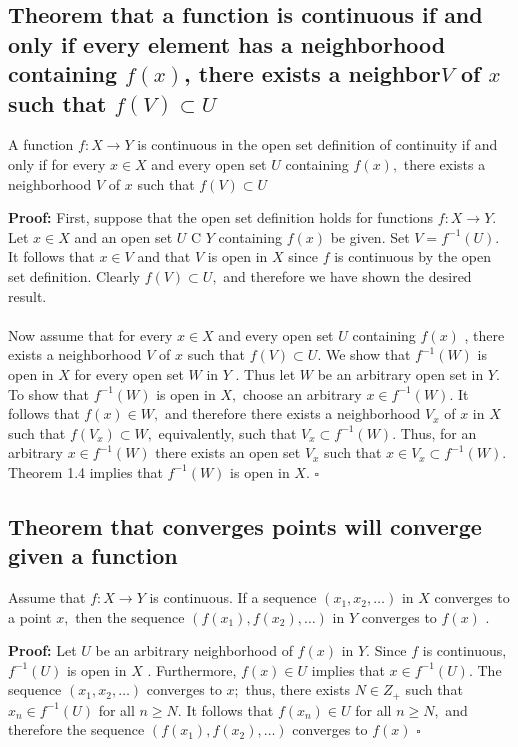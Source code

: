 \documentclass[12pt]{article}
\newenvironment{proofed}[1][]{\par \medskip \noindent \textbf{#1 Proof: }}{\hfill$\square$}
\begin{document}
	\subsection{Theorem that a function is continuous if and only if every element has a neighborhood containing $ f(x) $, there exists a neighbor$ V $ of $ x $ such that $ f(V)\subset U $}
		A function $f : X \rightarrow Y$ is continuous in the open set definition of continuity if and only if for every $x \in X$ and every open set $U$ containing $f ( x ) ,$ there exists a neighborhood $V$ of $x$ such that $f ( V ) \subset U$
		\begin{proofed}
			First, suppose that the open set definition holds for functions
			$f : X \rightarrow Y .$ Let $x \in X$ and an open set $U$ C $Y$ containing $f ( x )$ be
			given. Set $V = f ^ { - 1 } ( U ) .$ It follows that $x \in V$ and that $V$ is open in $X$
			since $f$ is continuous by the open set definition. Clearly $f ( V ) \subset U ,$ and
			therefore we have shown the desired result.\\
			\\
			Now assume that for every $x \in X$ and every open set $U$ containing
			$f ( x )$ , there exists a neighborhood $V$ of $x$ such that $f ( V ) \subset U .$ We show
			that $f ^ { - 1 } ( W )$ is open in $X$ for every open set $W$ in $Y$ . Thus let $W$ be an arbitrary open set in $Y .$ To show that $f ^ { - 1 } ( W )$ is open in $X ,$ choose an
			arbitrary $x \in f ^ { - 1 } ( W ) .$ It follows that $f ( x ) \in W ,$ and therefore there
			exists a neighborhood $V _ { x }$ of $x$ in $X$ such that $f \left( V _ { x } \right) \subset W ,$ equivalently,
			such that $V _ { x } \subset f ^ { - 1 } ( W ) .$ Thus, for an arbitrary $x \in f ^ { - 1 } ( W )$ there exists an open set $V _ { x }$ such that $x \in V _ { x } \subset f ^ { - 1 } ( W ) .$ Theorem 1.4 implies that
			$f ^ { - 1 } ( W )$ is open in $X .$
		\end{proofed}
	\subsection{Theorem that converges points will converge given a function}
		 Assume that $f : X \rightarrow Y$ is continuous. If a sequence
		$\left( x _ { 1 } , x _ { 2 } , \ldots \right)$ in $X$ converges to a point $x ,$ then the sequence $\left( f \left( x _ { 1 } \right) , f \left( x _ { 2 } \right) , \ldots \right)$
		in $Y$ converges to $f ( x )$ .
		\begin{proofed}
			Let $U$ be an arbitrary neighborhood of $f ( x )$ in $Y .$ Since $f$ is
			continuous, $f ^ { - 1 } ( U )$ is open in $X$ . Furthermore, $f ( x ) \in U$ implies that
			$x \in f ^ { - 1 } ( U ) .$ The sequence $\left( x _ { 1 } , x _ { 2 } , \ldots \right)$ converges to $x ;$ thus, there exists $N \in Z _ { + }$ such that $x _ { n } \in f ^ { - 1 } ( U )$ for all $n \geq N .$ It follows that
			$f \left( x _ { n } \right) \in U$ for all $n \geq N ,$ and therefore the sequence $\left( f \left( x _ { 1 } \right) , f \left( x _ { 2 } \right) , \ldots \right)$
			converges to $f ( x )$
		\end{proofed}
\end{document}
